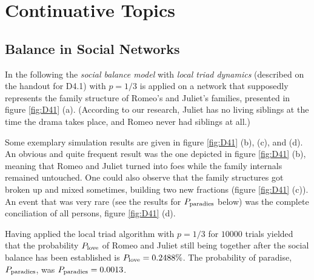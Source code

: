 \documentclass{scrartcl}
\begin{document}


\clearpage
\setcounter{section}{3}
\section{Continuative Topics}
\subsection{Balance in Social Networks}
In the following the \emph{social balance model} with \emph{local triad
dynamics} (described on the handout for D4.1) with $p = 1/3$ is applied on
a network that supposedly represents the family structure of Romeo's and
Juliet's families, presented in figure \ref{fig:D41} (a).  (According to
our research, Juliet has no living siblings at the time the drama takes
place, and Romeo never had siblings at all.)

Some exemplary simulation results are given in figure \ref{fig:D41} (b),
(c), and (d).
An obvious and quite frequent result was the one depicted in figure \ref{fig:D41}
(b), meaning that Romeo and Juliet turned into foes while the family
internals remained untouched.  One could also observe that the family
structures got broken up and mixed sometimes, building two new fractions
(figure \ref{fig:D41} (c)). An event that was very rare (see the results for
$P_{\mathrm{paradies}}$ below) was the complete conciliation of all persons,
figure \ref{fig:D41} (d).

Having applied the local triad algorithm with $p = 1/3$ for $10000$ trials
yielded that the probability $P_{\mathrm{love}}$ of Romeo and Juliet still being together after
the social balance has been established is $P_{\mathrm{love}} = 0.2488\%$.
The probability of paradise, $P_{\mathrm{paradies}}$, was $P_{\mathrm{paradies}} = 0.0013$.
\end{document}
